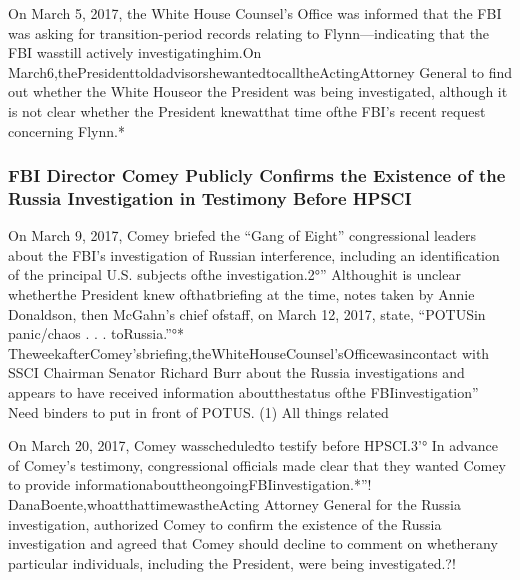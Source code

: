 On March 5, 2017, the White House Counsel’s Office was informed that the FBI was asking for transition-period records relating to Flynn—indicating that the FBI wasstill actively investigatinghim.On March6,thePresidenttoldadvisorshewantedtocalltheActingAttorney General to find out whether the White Houseor the President was being investigated, although it is not clear whether the President knewatthat time ofthe FBI’s recent request concerning Flynn.*

\subsubsection{FBI Director Comey Publicly Confirms the Existence of the Russia Investigation in Testimony Before HPSCI}

On March 9, 2017, Comey briefed the “Gang of Eight” congressional leaders about the FBI’s investigation of Russian interference, including an identification of the principal U.S. subjects ofthe investigation.2°” Althoughit is unclear whetherthe President knew ofthatbriefing at the time, notes taken by Annie Donaldson, then McGahn’s chief ofstaff, on March 12, 2017,
state, “POTUSin panic/chaos . . .
toRussia.”°* TheweekafterComey’sbriefing,theWhiteHouseCounsel’sOfficewasincontact with SSCI Chairman Senator Richard Burr about the Russia investigations and appears to have received information aboutthestatus ofthe FBIinvestigation”
Need binders to put in front of POTUS. (1) All things related

On March 20, 2017, Comey wasscheduledto testify before HPSCI.3'° In advance of Comey’s testimony, congressional officials made clear that they wanted Comey to provide informationabouttheongoingFBIinvestigation.*''! DanaBoente,whoatthattimewastheActing Attorney General for the Russia investigation, authorized Comey to confirm the existence of the Russia investigation and agreed that Comey should decline to comment on whetherany particular individuals, including the President, were being investigated.?!


